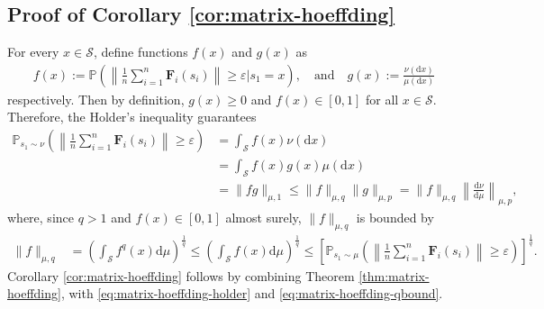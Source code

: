 \subsection{Proof of Corollary \ref{cor:matrix-hoeffding}}\label{app:proof-cor-matrix-hoeffding}
For every $x \in \mathcal{S}$, define functions $f(x)$ and $g(x)$ as 
\begin{align*}
f(x):= \mathbb{P}\left(\left\|\frac{1}{n}\sum_{i=1}^n \bm{F}_i(s_i)\right\| \geq \varepsilon \Bigg| s_1 = x\right), \quad \text{and} \quad g(x) := \frac{\nu(\mathrm{d}x)}{\mu(\mathrm{d}x)}
\end{align*}
respectively. Then by definition, $g(x) \geq 0$ and $f(x) \in [0,1]$ for all $x \in \mathcal{S}$. Therefore, the Holder's inequality guarantees
\begin{align}\label{eq:matrix-hoeffding-holder}
\mathbb{P}_{s_1 \sim \nu}\left(\left\|\frac{1}{n}\sum_{i=1}^n \bm{F}_i(s_i)\right\| \geq \varepsilon \right)&=\int_{\mathcal{S}}f(x) \nu(\mathrm{d}x)\nonumber \\
&= \int_{\mathcal{S}}f(x) g(x) \mu(\mathrm{d}x) \nonumber \\ 
&=\|fg\|_{\mu,1} \leq \|f\|_{\mu,q} \|g\|_{\mu,p} = \|f\|_{\mu,q}\left\|\frac{\mathrm{d}\nu}{\mathrm{d}\mu}\right\|_{\mu,p},
\end{align}
where, since $q > 1$ and $f(x) \in [0,1]$ almost surely, $\|f\|_{\mu,q}$ is bounded by
\begin{align}\label{eq:matrix-hoeffding-qbound}
\|f\|_{\mu,q} &= \left(\int_{\mathcal{S}}f^q(x)\mathrm{d}\mu \right)^{\frac{1}{q}}  
\leq \left(\int_{\mathcal{S}}f(x)\mathrm{d}\mu \right)^{\frac{1}{q}}  
\leq \left[\mathbb{P}_{s_1 \sim \mu}\left(\left\|\frac{1}{n}\sum_{i=1}^n \bm{F}_i(s_i)\right\| \geq \varepsilon \right)\right]^{\frac{1}{q}}.
\end{align}
Corollary \ref{cor:matrix-hoeffding} follows by combining Theorem \ref{thm:matrix-hoeffding}, with \eqref{eq:matrix-hoeffding-holder} and \eqref{eq:matrix-hoeffding-qbound}.






